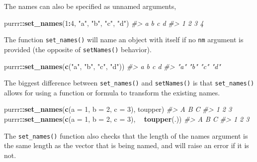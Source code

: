 \documentclass[]{book}
\newenvironment{Shaded}{\begin{snugshade}}{\end{snugshade}}
\newcommand{\CommentTok}[1]{\textcolor[rgb]{0.56,0.35,0.01}{\textit{#1}}}
\newcommand{\DataTypeTok}[1]{\textcolor[rgb]{0.13,0.29,0.53}{#1}}
\newcommand{\DecValTok}[1]{\textcolor[rgb]{0.00,0.00,0.81}{#1}}
\newcommand{\KeywordTok}[1]{\textcolor[rgb]{0.13,0.29,0.53}{\textbf{#1}}}
\newcommand{\NormalTok}[1]{#1}
\newcommand{\OperatorTok}[1]{\textcolor[rgb]{0.81,0.36,0.00}{\textbf{#1}}}
\newcommand{\StringTok}[1]{\textcolor[rgb]{0.31,0.60,0.02}{#1}}
\theoremstyle{plain}
\theoremstyle{remark}
\begin{document}
The names can also be specified as unnamed arguments,

\begin{Shaded}
\begin{Highlighting}[]
\NormalTok{purrr}\OperatorTok{::}\KeywordTok{set_names}\NormalTok{(}\DecValTok{1}\OperatorTok{:}\DecValTok{4}\NormalTok{, }\StringTok{"a"}\NormalTok{, }\StringTok{"b"}\NormalTok{, }\StringTok{"c"}\NormalTok{, }\StringTok{"d"}\NormalTok{)}
\CommentTok{#> a b c d }
\CommentTok{#> 1 2 3 4}
\end{Highlighting}
\end{Shaded}

The function \texttt{set\_names()} will name an object with itself if no \texttt{nm} argument is
provided (the opposite of \texttt{setNames()} behavior).

\begin{Shaded}
\begin{Highlighting}[]
\NormalTok{purrr}\OperatorTok{::}\KeywordTok{set_names}\NormalTok{(}\KeywordTok{c}\NormalTok{(}\StringTok{"a"}\NormalTok{, }\StringTok{"b"}\NormalTok{, }\StringTok{"c"}\NormalTok{, }\StringTok{"d"}\NormalTok{))}
\CommentTok{#>   a   b   c   d }
\CommentTok{#> "a" "b" "c" "d"}
\end{Highlighting}
\end{Shaded}

The biggest difference between \texttt{set\_names()} and \texttt{setNames()} is that \texttt{set\_names()} allows for using a function or formula to transform the existing names.

\begin{Shaded}
\begin{Highlighting}[]
\NormalTok{purrr}\OperatorTok{::}\KeywordTok{set_names}\NormalTok{(}\KeywordTok{c}\NormalTok{(}\DataTypeTok{a =} \DecValTok{1}\NormalTok{, }\DataTypeTok{b =} \DecValTok{2}\NormalTok{, }\DataTypeTok{c =} \DecValTok{3}\NormalTok{), toupper)}
\CommentTok{#> A B C }
\CommentTok{#> 1 2 3}
\NormalTok{purrr}\OperatorTok{::}\KeywordTok{set_names}\NormalTok{(}\KeywordTok{c}\NormalTok{(}\DataTypeTok{a =} \DecValTok{1}\NormalTok{, }\DataTypeTok{b =} \DecValTok{2}\NormalTok{, }\DataTypeTok{c =} \DecValTok{3}\NormalTok{), }\OperatorTok{~}\StringTok{ }\KeywordTok{toupper}\NormalTok{(.))}
\CommentTok{#> A B C }
\CommentTok{#> 1 2 3}
\end{Highlighting}
\end{Shaded}

The \texttt{set\_names()} function also checks that the length of the names argument is the
same length as the vector that is being named, and will raise an error if it is not.
\end{document}
